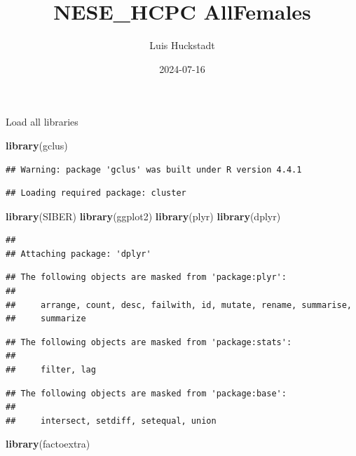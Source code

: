 \documentclass[
]{article}
\title{NESE\_HCPC AllFemales}
\author{Luis Huckstadt}
\date{2024-07-16}
\newenvironment{Shaded}{\begin{snugshade}}{\end{snugshade}}
\newcommand{\FunctionTok}[1]{\textcolor[rgb]{0.13,0.29,0.53}{\textbf{#1}}}
\newcommand{\NormalTok}[1]{#1}
\begin{document}
\maketitle

Load all libraries

\begin{Shaded}
\begin{Highlighting}[]
\FunctionTok{library}\NormalTok{(gclus)}
\end{Highlighting}
\end{Shaded}

\begin{verbatim}
## Warning: package 'gclus' was built under R version 4.4.1
\end{verbatim}

\begin{verbatim}
## Loading required package: cluster
\end{verbatim}

\begin{Shaded}
\begin{Highlighting}[]
\FunctionTok{library}\NormalTok{(SIBER)}
\FunctionTok{library}\NormalTok{(ggplot2)}
\FunctionTok{library}\NormalTok{(plyr)}
\FunctionTok{library}\NormalTok{(dplyr)}
\end{Highlighting}
\end{Shaded}

\begin{verbatim}
## 
## Attaching package: 'dplyr'
\end{verbatim}

\begin{verbatim}
## The following objects are masked from 'package:plyr':
## 
##     arrange, count, desc, failwith, id, mutate, rename, summarise,
##     summarize
\end{verbatim}

\begin{verbatim}
## The following objects are masked from 'package:stats':
## 
##     filter, lag
\end{verbatim}

\begin{verbatim}
## The following objects are masked from 'package:base':
## 
##     intersect, setdiff, setequal, union
\end{verbatim}

\begin{Shaded}
\begin{Highlighting}[]
\FunctionTok{library}\NormalTok{(factoextra)}
\end{Highlighting}
\end{Shaded}
\end{document}
